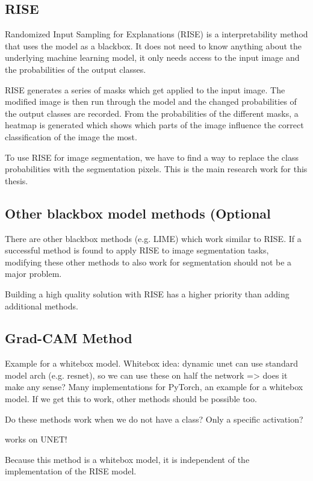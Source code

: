 \subsection{RISE}
Randomized Input Sampling for Explanations (RISE) is a interpretability method that uses the model as a blackbox. It does not need to know anything about the underlying machine learning model, it only needs access to the input image and the probabilities of the output classes.

RISE generates a series of masks which get applied to the input image. The modified image is then run through the model and the changed probabilities of the output classes are recorded. From the probabilities of the different masks, a heatmap is generated which shows which parts of the image influence the correct classification of the image the most.

To use RISE for image segmentation, we have to find a way to replace the class probabilities with the segmentation pixels. This is the main research work for this thesis.

\subsection{Other blackbox model methods (Optional}
There are other blackbox methods (e.g. LIME\cite{ribeiro2016should}) which work similar to RISE. If a successful method is found to apply RISE to image segmentation tasks, modifying these other methods to also work for segmentation should not be a major problem.

Building a high quality solution with RISE has a higher priority than adding additional methods.

\subsection{Grad-CAM Method}




Example for a whitebox model. Whitebox idea: dynamic unet can use standard model arch (e.g. resnet), so we can use these on half the network => does it make any sense?
Many implementations for PyTorch, an example for a whitebox model. If we get this to work, other methods should be possible too.

Do these methods work when we do not have a class? Only a specific activation?

works on UNET!

Because this method is a whitebox model, it is independent of the implementation of the RISE model.


